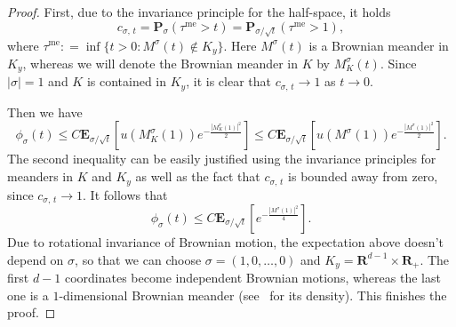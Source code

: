 \documentclass[10pt]{amsart}
\theoremstyle{definition}\newtheorem{defi}[theo]{Definition}\newtheorem{rema}[theo]{Remark}\newtheorem{exam}[theo]{Example}\newtheorem{exem}[theo]{Example}\newtheorem{nota}[theo]{Notation}
\DeclareMathOperator{\me}{me}
\newcommand{\pr}{\mathbf{P}}
\newcommand{\e}{\mathbf{E}}
\newcommand{\bfR}{\mathbf{R}}
\newcommand{\ra}{\rightarrow}
\renewcommand{\le}{\leqslant}
\begin{document}
\begin{proof}
First, due to the invariance principle for the half-space, it holds
\[
c_{\sigma,\,t} = \pr_{\sigma}\left(\tau^{\me}>t\right) = \pr_{\sigma/\sqrt{t}}\left(\tau^{\me}>1\right),
\]
where $\tau^{\me}: = \inf\{t>0:M^{\sigma}(t)\not\in K_y\}$. Here $M^{\sigma}(t)$ is a Brownian meander in $K_{y}$, whereas we will denote the Brownian meander in $K$ by $M_K^{\sigma}(t)$. Since $|\sigma| = 1$ and $K$ is contained in $K_y$, it is clear that $c_{\sigma,\,t}\ra 1$ as $t\ra 0$.

Then we have
\[
\phi_{\sigma}(t)\le C\e_{\sigma/\sqrt{t}}\left[u\left(M_K^{\sigma}(1)\right)e^{-\frac{\left|M_K^{\sigma}(1)\right|^2}{2}}\right]\le C\e_{\sigma/\sqrt{t}}\left[u\left(M^{\sigma}(1)\right)e^{-\frac{\left| M^{\sigma}(1)\right|^2}{2}}\right].
\]
The second inequality can be easily justified using the invariance principles for meanders in $K$ and $K_y$ as well as the fact that $c_{\sigma,\,t}$ is bounded away from zero, since $c_{\sigma,\,t}\ra 1$. It follows that
\[
\phi_{\sigma}(t)\le C\e_{\sigma/\sqrt{t}}\left[e^{-\frac{\left| M^{\sigma}(1)\right|^2}{4}}\right].
\]
Due to rotational invariance of Brownian motion, the expectation above doesn't depend on $\sigma$, so that we can choose $\sigma = (1,0,\ldots,0)$ and $K_y = \bfR^{d-1}\times \bfR_+$. The first $d-1$ coordinates become independent Brownian motions, whereas the last one is a $1$-dimensional Brownian meander (see~\cite{DuIgMi-77} for its density). This finishes the proof.
\end{proof}
\end{document}
